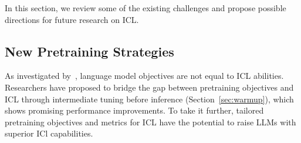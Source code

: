 In this section, we review some of the existing challenges and propose possible directions for future research on ICL.
\subsection{New Pretraining Strategies}
As investigated by~\citet{corpusscale}, language model objectives are not equal to   ICL abilities. Researchers have proposed to bridge the gap between pretraining objectives and ICL through intermediate tuning before inference (Section~\ref{sec:warmup}), which shows promising performance improvements. To take it further, tailored pretraining objectives and metrics for ICL have the potential to raise LLMs with superior ICl capabilities.




